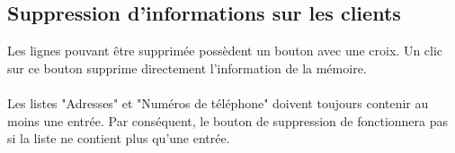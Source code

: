 \subsection{Suppression d'informations sur les clients}
Les lignes pouvant être supprimée possèdent
un bouton avec une croix. Un clic sur ce bouton supprime directement
l'information de la mémoire.

\paragraph{}
Les listes "Adresses" et "Numéros de téléphone" doivent toujours contenir au
moins une entrée. Par conséquent, le bouton de suppression de fonctionnera pas
si la liste ne contient plus qu'une entrée.
